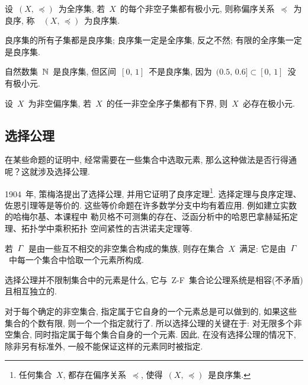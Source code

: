 \begin{definition}
设~$(X,\,\preccurlyeq)$~为全序集, 若~$X$~的每个非空子集都有极小元, 则称偏序关系~$\preccurlyeq$~为良序,
称~~$(X,\,\preccurlyeq)$~为良序集.
\end{definition}

\begin{remark}
良序集的所有子集都是良序集; 良序集一定是全序集, 反之不然; 有限的全序集一定是良序集.
\end{remark}

\medskip

\begin{example}
自然数集~$\mathbb{N}$~是良序集, 但区间~$[0,\,1]$~不是良序集, 因为~$(0.5,\,0.6] \subset [0,\,1]$~没有极小元.
\end{example}

\medskip

\begin{theorem}
设~$X$~为非空偏序集, 若~$X$~的任一非空全序子集都有下界, 则~$X$~必存在极小元.
\end{theorem}

\subsection*{选择公理}

在某些命题的证明中, 经常需要在一些集合中选取元素, 那么这种做法是否行得通呢？这就涉及选择公理.

1904~年, 策梅洛提出了选择公理, 并用它证明了良序定理\footnote{任何集合~$X$, 都存在偏序关系~$\preccurlyeq$, 使得~$(X,\,\preccurlyeq)$~是良序集. }. 选择定理与良序定理、佐恩引理等是等价的.
这些等价命题在许多数学分支中均有着应用. 例如建立实数的哈梅尔基、本课程中
勒贝格不可测集的存在、泛函分析中的哈恩\raisebox{0.5mm}{--}巴拿赫延拓定理、拓扑学中乘积拓扑
空间紧性的吉洪诺夫定理等.

\begin{theorem}
若~${\mathnormal\Gamma}$~是由一些互不相交的非空集合构成的集族, 则存在集合~$X$~满足: 它是由~${\mathnormal\Gamma}$~中每一个集合中恰取一个元素所构成.
\end{theorem}

选择公理并不限制集合中的元素是什么, 它与~Z-F~集合论公理系统是相容(不矛盾)
且相互独立的.

对于每个确定的非空集合, 指定属于它自身的一个元素总是可以做到的, 如果这些集合的个数有限,
则一个一个指定就行了. 所以选择公理的关键在于: 对无限多个非空集合, 同时指定属于每个集合自身的一个元素.
因此, 在没有选择公理的情况下, 除非另有标准外, 一般不能保证这样的元素同时被指定.

